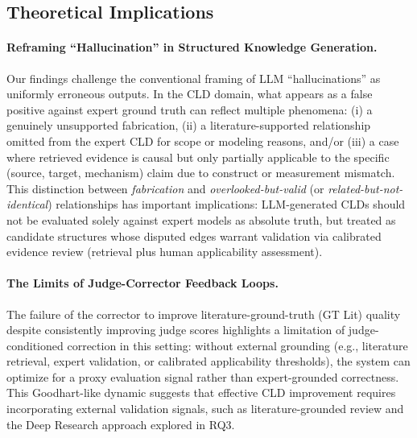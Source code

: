 \subsection{Theoretical Implications}
\label{sec:conclusion_theory}

\paragraph{Reframing ``Hallucination'' in Structured Knowledge Generation.}
Our findings challenge the conventional framing of LLM ``hallucinations'' as uniformly erroneous outputs. In the CLD domain, what appears as a false positive against expert ground truth can reflect multiple phenomena: (i) a genuinely unsupported fabrication, (ii) a literature-supported relationship omitted from the expert CLD for scope or modeling reasons, and/or (iii) a case where retrieved evidence is causal but only partially applicable to the specific (source, target, mechanism) claim due to construct or measurement mismatch. This distinction between \textit{fabrication} and \textit{overlooked-but-valid} (or \textit{related-but-not-identical}) relationships has important implications: LLM-generated CLDs should not be evaluated solely against expert models as absolute truth, but treated as candidate structures whose disputed edges warrant validation via calibrated evidence review (retrieval plus human applicability assessment).

\paragraph{The Limits of Judge-Corrector Feedback Loops.}
The failure of the corrector to improve literature-ground-truth (GT Lit) quality despite consistently improving judge scores highlights a limitation of judge-conditioned correction in this setting: without external grounding (e.g., literature retrieval, expert validation, or calibrated applicability thresholds), the system can optimize for a proxy evaluation signal rather than expert-grounded correctness. This Goodhart-like dynamic suggests that effective CLD improvement requires incorporating external validation signals, such as literature-grounded review and the Deep Research approach explored in RQ3.

